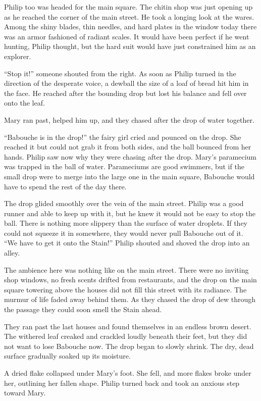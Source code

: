 \documentclass[10pt, draft]{memoir}
\begin{document}
Philip too was headed for the main square. The chitin shop was just opening up
as he reached the corner of the main street. He took a longing look at the
wares. Among the shiny blades, thin needles, and hard plates in the window
today there was an armor fashioned of radiant scales. It would have been
perfect if he went hunting, Philip thought, but the hard suit would have just
constrained him as an explorer.

``Stop it!'' someone shouted from the right. As soon as Philip turned in the
direction of the desperate voice, a dewball the size of a loaf of bread hit him
in the face. He reached after the bounding drop but lost his balance and fell
over onto the leaf.

Mary ran past, helped him up, and they chased after the drop of water together.

``Babouche is in the drop!'' the fairy girl cried and pounced on the drop. She
reached it but could not grab it from both sides, and the ball bounced from her
hands. Philip saw now why they were chasing after the drop. Mary's paramecium
was trapped in the ball of water. Parameciums are good swimmers, but if the
small drop were to merge into the large one in the main square, Babouche would
have to spend the rest of the day there.

The drop glided smoothly over the vein of the main street. Philip was a good
runner and able to keep up with it, but he knew it would not be easy to stop
the ball. There is nothing more slippery than the surface of water droplets. If
they could not squeeze it in somewhere, they would never pull Babouche out of
it. ``We have to get it onto the Stain!'' Philip shouted and shoved the drop
into an alley.

The ambience here was nothing like on the main street. There were no inviting
shop windows, no fresh scents drifted from restaurants, and the drop on the
main square towering above the houses did not fill this street with its
radiance. The murmur of life faded away behind them. As they chased the drop of
dew through the passage they could soon smell the Stain ahead.

They ran past the last houses and found themselves in an endless brown desert.
The withered leaf creaked and crackled loudly beneath their feet, but they did
not want to lose Babouche now. The drop began to slowly shrink. The dry, dead
surface gradually soaked up its moisture.

A dried flake collapsed under Mary's foot. She fell, and more flakes broke under
her, outlining her fallen shape. Philip turned back and took an anxious step
toward Mary.
\end{document}
